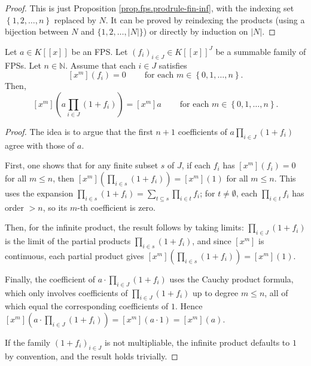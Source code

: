 \begin{proof}
This is just
Proposition \ref{prop.fps.prodrule-fin-inf}, with the indexing set $\left\{
1,2,\ldots,n\right\}  $ replaced by $N$. It can be proved by reindexing the
products (using a bijection between $N$ and $\{1,2,\ldots,|N|\}$) or directly by induction on $\left\vert N\right\vert $.
\end{proof}

\begin{lemma}
\label{lem.fps.prod.irlv.inf}
\leantarget
\leanok
Let $a\in K\left[  \left[  x\right]  \right]  $
be an FPS. Let $\left(  f_{i}\right)  _{i\in J}\in K\left[  \left[  x\right]
\right]  ^{J}$ be a summable family of FPSs. Let $n\in\mathbb{N}$. Assume that
each $i\in J$ satisfies
\begin{equation}
\left[  x^{m}\right]  \left(  f_{i}\right)  =0\ \ \ \ \ \ \ \ \ \ \text{for
each }m\in\left\{  0,1,\ldots,n\right\}  .
\label{eq.lem.fps.prod.irlv.inf.ass}%
\end{equation}
Then,
\[
\left[  x^{m}\right]  \left(  a\prod_{i\in J}\left(  1+f_{i}\right)  \right)
=\left[  x^{m}\right]  a\ \ \ \ \ \ \ \ \ \ \text{for each }m\in\left\{
0,1,\ldots,n\right\}  .
\]
\end{lemma}

\begin{proof}
The idea is to argue that the first $n+1$ coefficients of $a\prod_{i\in J}\left(
1+f_{i}\right)  $ agree with those of $a$.

First, one shows that for any finite subset $s$ of $J$, if each $f_i$ has
$[x^m](f_i) = 0$ for all $m\le n$, then
$[x^m](\prod_{i\in s}(1+f_i)) = [x^m](1)$ for all $m\le n$.
This uses the expansion $\prod_{i\in s}(1+f_i) = \sum_{t\subseteq s}\prod_{i\in t}f_i$;
for $t\ne\emptyset$, each $\prod_{i\in t}f_i$ has order $>n$, so its $m$-th
coefficient is zero.

Then, for the infinite product, the result follows by taking limits:
$\prod_{i\in J}(1+f_i)$ is the limit of the partial products $\prod_{i\in s}(1+f_i)$,
and since $[x^m]$ is continuous, each partial product gives
$[x^m](\prod_{i\in s}(1+f_i)) = [x^m](1)$.

Finally, the coefficient of $a\cdot\prod_{i\in J}(1+f_i)$ uses the Cauchy product formula,
which only involves coefficients of $\prod_{i\in J}(1+f_i)$ up to degree $m\le n$,
all of which equal the corresponding coefficients of $1$.
Hence $[x^m](a\cdot\prod_{i\in J}(1+f_i)) = [x^m](a\cdot 1) = [x^m](a)$.

If the family $(1+f_i)_{i\in J}$ is not multipliable,
the infinite product defaults to $1$ by convention, and the result holds trivially.
\end{proof}

